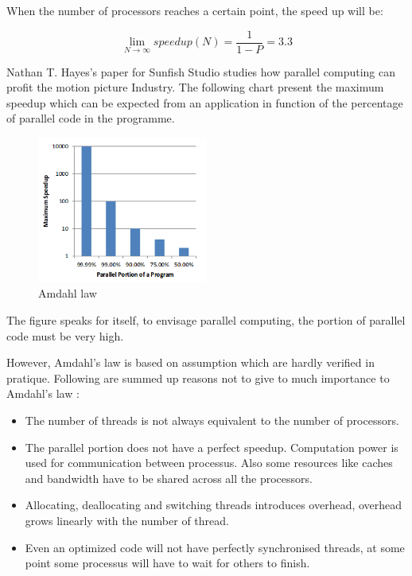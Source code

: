 When the number of processors reaches a certain point, the speed up will be:


$$\lim\limits_{N \to \infty} speedup(N)= \frac{1}{1-P} = 3.3$$


Nathan T. Hayes's paper for Sunfish Studio \citep{Reference8} studies how
parallel computing can profit the motion picture Industry. The following chart
present the maximum speedup which can be expected from an application in
function of the percentage of parallel code in the programme.

\begin{figure}[H] 
  \centering
  \includegraphics[width=0.5\textwidth]{./Figures/amdahl.png}
  \caption[Amdahl law]{Amdahl law \citep{Reference8}} 
  \label{fig:amdahl} 
\end{figure}

The figure speaks for itself, to envisage parallel computing, the portion of
parallel code must be very high.

However, Amdahl's law is based on assumption which are hardly verified in
pratique. Following are summed up reasons not to give to much importance to
Amdahl's law \citep{Reference34}:

\begin{itemize} 
  \item The number of threads is not always equivalent to the number of processors.  
  \item The parallel portion does not have a perfect speedup. Computation power is used
    for communication between processus. Also some resources like caches and bandwidth
    have to be shared across all the processors.  
  \item Allocating, deallocating and switching threads introduces overhead, overhead grows
    linearly with the number of thread.  
  \item Even an optimized code will not have perfectly synchronised threads, at some point
    some processus will have to wait for others to finish.	
\end{itemize}


